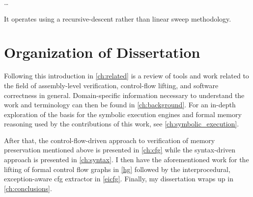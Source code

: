 \todo\dots

It operates using a recursive-descent rather than linear sweep methodology.


\section{Organization of Dissertation}
Following this introduction in \cref{ch:related} is a review of tools and work related to the field of assembly-level verification, control-flow lifting, and software correctness in general.
Domain-specific information necessary to understand the work and terminology can then be found in \cref{ch:background}.
For an in-depth exploration of the basis for the symbolic execution engines and formal memory reasoning used by the contributions of this work,
see \cref{ch:symbolic_execution}.

After that, the control-flow-driven approach to verification of memory preservation mentioned above is presented in \cref{ch:cfg}
while the syntax-driven approach is presented in \cref{ch:syntax}.
I then have the aforementioned work for the lifting of formal control flow graphs in \cref{hg}
followed by the interprocedural, exception-aware \ac{cfg} extractor in \cref{eicfg}.
Finally, my dissertation wraps up in \cref{ch:conclusions}.
